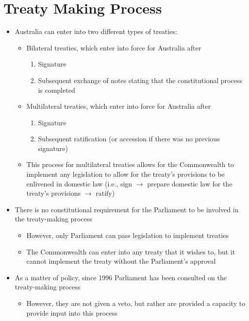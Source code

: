 \section{Treaty Making Process}
\begin{itemize}
    \item Australia can enter into two different types of treaties:
    \begin{itemize}
        \item Bilateral treaties, which enter into force for Australia after
        \begin{enumerate}
            \item Signature
            \item Subsequent exchange of notes stating that the constitutional process is completed
        \end{enumerate}
        \item Multilateral treaties, which enter into force for Australia after
        \begin{enumerate}
            \item Signature
            \item Subsequent ratification (or accession if there was no previous signature)
        \end{enumerate}
        \item This process for multilateral treaties allows for the Commonwealth to implement any legislation to allow for the treaty's provisions to be enlivened in domestic law (i.e., sign $\rightarrow$ prepare domestic law for the treaty's provisions $\rightarrow$ ratify)
    \end{itemize}
    \item There is no constitutional requirement for the Parliament to be involved in the treaty-making process
    \begin{itemize}
        \item However, only Parliament can pass legislation to implement treaties
        \item The Commonwealth can enter into any treaty that it wishes to, but it cannot implement the treaty without the Parliament's approval
    \end{itemize}
    \item As a matter of policy, since 1996 Parliament has been consulted on the treaty-making process
    \begin{itemize}
        \item However, they are not given a veto, but rather are provided a capacity to provide input into this process

\end{itemize}
\end{itemize}
